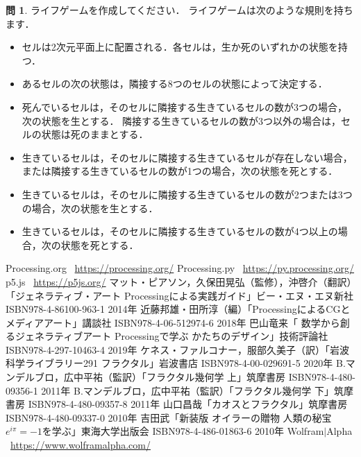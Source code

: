 \documentclass[dvipdfmx]{jsarticle}
\theoremstyle{definition}
\newtheorem{question}{問}[section]
\begin{document}
\begin{question}
    ライフゲームを作成してください．
    ライフゲームは次のような規則を持ちます．
    \begin{itemize}
        \item セルは2次元平面上に配置される．各セルは，生か死のいずれかの状態を持つ．
        \item あるセルの次の状態は，隣接する8つのセルの状態によって決定する．
        \item 死んでいるセルは，そのセルに隣接する生きているセルの数が3つの場合，次の状態を生とする．
            隣接する生きているセルの数が3つ以外の場合は，セルの状態は死のままとする．
        \item 生きているセルは，そのセルに隣接する生きているセルが存在しない場合，
            または隣接する生きているセルの数が1つの場合，次の状態を死とする．
        \item 生きているセルは，そのセルに隣接する生きているセルの数が2つまたは3つの場合，次の状態を生とする．
        \item 生きているセルは，そのセルに隣接する生きているセルの数が4つ以上の場合，次の状態を死とする．
    \end{itemize}
\end{question}


\begin{thebibliography}{99}
     Processing.org \ \url{https://processing.org/}
     Processing.py \ \url{https://py.processing.org/}
     p5.js \ \url{https://p5js.org/}
     マット・ピアソン，久保田晃弘（監修），沖啓介（翻訳）「ジェネラティブ・アート Processingによる実践ガイド」ビー・エヌ・エヌ新社 ISBN978-4-86100-963-1 2014年
     近藤邦雄・田所淳（編）「ProcessingによるCGとメディアアート」講談社 ISBN978-4-06-512974-6 2018年
     巴山竜来「 数学から創るジェネラティブアート Processingで学ぶ かたちのデザイン」技術評論社 ISBN978-4-297-10463-4 2019年
     ケネス・ファルコナー，服部久美子（訳）「岩波科学ライブラリー291 フラクタル」岩波書店 ISBN978-4-00-029691-5 2020年
     B.マンデルブロ，広中平祐（監訳）「フラクタル幾何学 上」筑摩書房 ISBN978-4-480-09356-1 2011年
     B.マンデルブロ，広中平祐（監訳）「フラクタル幾何学 下」筑摩書房 ISBN978-4-480-09357-8 2011年
     山口昌哉「カオスとフラクタル」筑摩書房 ISBN978-4-480-09337-0 2010年
     吉田武「新装版 オイラーの贈物 人類の秘宝$e^{i\pi}=-1$を学ぶ」東海大学出版会 ISBN978-4-486-01863-6 2010年
     Wolfram$|$Alpha \ \url{https://www.wolframalpha.com/}
\end{thebibliography}
\clearpage
\end{document}
